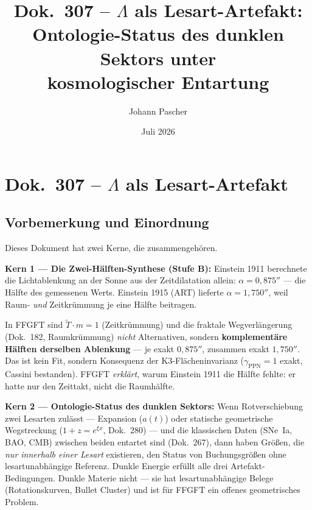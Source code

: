 \documentclass[11pt]{report}
\title{Dok.~307 -- $\Lambda$ als Lesart-Artefakt:\\
Ontologie-Status des dunklen Sektors unter\\
kosmologischer Entartung}
\author{Johann Pascher}
\date{Juli 2026}
\begin{document}
\maketitle
\tableofcontents

\chapter*{Dok.~307 -- $\Lambda$ als Lesart-Artefakt}

\section*{Vorbemerkung und Einordnung}

Dieses Dokument hat zwei Kerne, die zusammengehören.

\medskip
\noindent\textbf{Kern 1 — Die Zwei-Hälften-Synthese (Stufe B):}
Einstein 1911 berechnete die Lichtablenkung an der Sonne aus der
Zeitdilatation allein: $\alpha = 0{,}875''$ — die Hälfte des gemessenen
Werts. Einstein 1915 (ART) lieferte $\alpha = 1{,}750''$, weil Raum-
\emph{und} Zeitkrümmung je eine Hälfte beitragen.

In FFGFT sind $\tilde T \cdot m = 1$ (Zeitkrümmung) und die fraktale
Wegverlängerung (Dok.~182, Raumkrümmung) \emph{nicht} Alternativen,
sondern \textbf{komplementäre Hälften derselben Ablenkung} — je exakt
$0{,}875''$, zusammen exakt $1{,}750''$. Das ist kein Fit, sondern
Konsequenz der K3-Flächeninvarianz ($\gamma_\text{PPN} = 1$ exakt,
Cassini bestanden). FFGFT \emph{erklärt}, warum Einstein 1911 die
Hälfte fehlte: er hatte nur den Zeittakt, nicht die Raumhälfte.

\medskip
\noindent\textbf{Kern 2 — Ontologie-Status des dunklen Sektors:}
Wenn Rotverschiebung zwei Lesarten zulässt — Expansion ($a(t)$) oder
statische geometrische Wegstreckung ($1+z = e^{\xi x}$, Dok.~280) —
und die klassischen Daten (SNe~Ia, BAO, CMB) zwischen beiden entartet
sind (Dok.~267), dann haben Größen, die \emph{nur innerhalb einer Lesart}
existieren, den Status von Buchungsgrößen ohne lesartunabhängige Referenz.
Dunkle Energie erfüllt alle drei Artefakt-Bedingungen. Dunkle Materie
nicht — sie hat lesartunabhängige Belege (Rotationskurven, Bullet Cluster)
und ist für FFGFT ein offenes geometrisches Problem.
\end{document}
